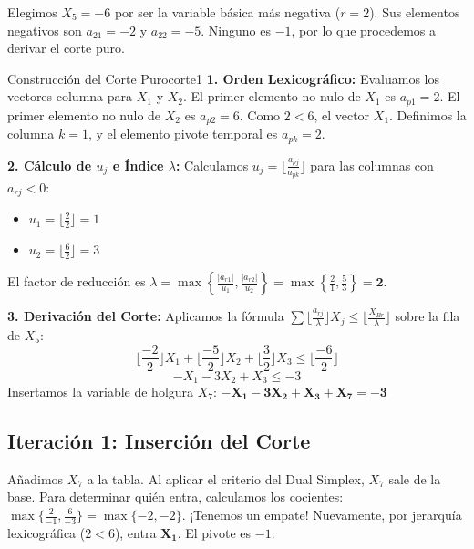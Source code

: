 \documentclass[10pt,a4paper]{article}
\begin{document}
Elegimos $X_5 = -6$ por ser la variable básica más negativa ($r=2$). Sus elementos negativos son $a_{21} = -2$ y $a_{22} = -5$. Ninguno es $-1$, por lo que procedemos a derivar el corte puro.

\begin{mytheo}{Construcción del Corte Puro}{corte1}
\textbf{1. Orden Lexicográfico:} Evaluamos los vectores columna para $X_1$ y $X_2$.
El primer elemento no nulo de $X_1$ es $a_{p1} = 2$.
El primer elemento no nulo de $X_2$ es $a_{p2} = 6$.
Como $2 < 6$, el vector $X_1$. Definimos la columna $k=1$, y el elemento pivote temporal es $a_{pk} = 2$.

\textbf{2. Cálculo de $u_j$ e Índice $\lambda$:}
Calculamos $u_j = \lfloor \frac{a_{pj}}{a_{pk}} \rfloor$ para las columnas con $a_{rj} < 0$:
\begin{itemize}
    \item $u_1 = \lfloor \frac{2}{2} \rfloor = 1$
    \item $u_2 = \lfloor \frac{6}{2} \rfloor = 3$
\end{itemize}
El factor de reducción es $\lambda = \max \left\{ \frac{|a_{r1}|}{u_1}, \frac{|a_{r2}|}{u_2} \right\} = \max \left\{ \frac{2}{1}, \frac{5}{3} \right\} = \mathbf{2}$.

\textbf{3. Derivación del Corte:}
Aplicamos la fórmula $\sum \lfloor \frac{a_{rj}}{\lambda} \rfloor X_j \leq \lfloor \frac{X_{Br}}{\lambda} \rfloor$ sobre la fila de $X_5$:
\[ \lfloor \frac{-2}{2} \rfloor X_1 + \lfloor \frac{-5}{2} \rfloor X_2 + \lfloor \frac{3}{2} \rfloor X_3 \leq \lfloor \frac{-6}{2} \rfloor \]
\[ -X_1 - 3X_2 + X_3 \leq -3 \]
Insertamos la variable de holgura $X_7$: $\mathbf{-X_1 - 3X_2 + X_3 + X_7 = -3}$
\end{mytheo}

\subsection{Iteración 1: Inserción del Corte}

Añadimos $X_7$ a la tabla. Al aplicar el criterio del Dual Simplex, $X_7$ sale de la base. Para determinar quién entra, calculamos los cocientes:
$\max \{ \frac{2}{-1}, \frac{6}{-3} \} = \max \{-2, -2\}$. 
¡Tenemos un empate! Nuevamente, por jerarquía lexicográfica ($2 < 6$), entra $\mathbf{X_1}$. El pivote es $-1$.
\end{document}

